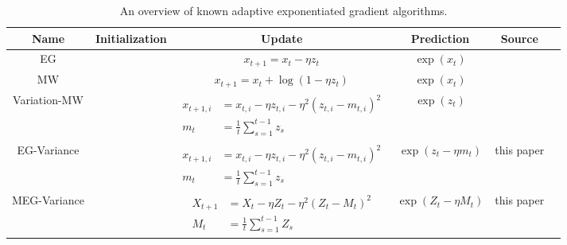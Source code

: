 \documentclass[paper_icml.tex]{subfiles}
\begin{document}
\begin{table*}
\begin{tabular}{|c|c|c|c|c|c|}
\hline 
Name & Initialization & Update & Prediction & Source \\
\hline 
EG & & $x_{t+1} = x_t - \eta z_t$ & $\exp(x_t)$ & \cite{kivinen1997} \\
\hline 
MW & & $x_{t+1} = x_t + \log(1 - \eta z_t)$ & $\exp(x_t)$ & \cite{cesa2007} \\
\hline 
Variation-MW & & $\begin{array}{rl} x_{t+1,i} &= x_{t,i} - \eta z_{t,i} - \eta^2 (z_{t,i}-m_{t,i})^2 \\ m_t &= \frac{1}{t} \sum_{s=1}^{t-1} z_s \end{array}$ & $\exp(z_t)$ & \cite{hazan2010variation} \\
\hline 
EG-Variance & & $\begin{array}{rl} x_{t+1,i} &= x_{t,i} - \eta z_{t,i} - \eta^2 (z_{t,i}-m_{t,i})^2 \\ m_t &= \frac{1}{t} \sum_{s=1}^{t-1} z_s \end{array}$ & $\exp(z_t - \eta m_t)$ & this paper \\
 \hline 
MEG-Variance & & $\begin{array}{rl} X_{t+1} &= X_t - \eta Z_t - \eta^2 (Z_t - M_t)^2 \\ M_t &= \frac{1}{t} \sum_{s=1}^{t-1} Z_s \end{array}$ & $\exp(Z_t - \eta M_t)$ & this paper \\
 \hline 
\end{tabular}
\caption{An overview of known adaptive exponentiated gradient algorithms.}
\label{tab:algorithms}
\end{table*}
\end{document}
